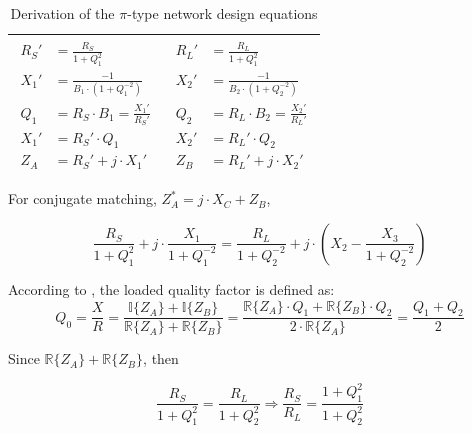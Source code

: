 \begin{table}[H]
\begin{tabular}{ | c | c | }
\begin{minipage}{.4\textwidth}
{\begin{align}
           R_S' &= \frac{R_S}{1 + Q_1^2}\\
           X_1' &= \frac{-1}{B_1 \cdot (1 + Q_1^{-2})} \\
           Q_1 &= R_S \cdot B_1 = \frac{X_1'}{R_S'}\\
           X_1' &= R_S' \cdot Q_1\\
           Z_A &= R_S' + j\cdot X_1'
         \end{align}}
    \end{minipage}
    &
        \begin{minipage}{.4\textwidth}
         {\begin{align}
           R_L' &= \frac{R_L}{1 + Q_1^2}\\
           X_2' &= \frac{-1}{B_2 \cdot (1 + Q_2  ^{-2})} \\
           Q_2 &= R_L \cdot B_2 = \frac{X_2'}{R_L'}\\
           X_2' &= R_L' \cdot Q_2\\
           Z_B &= R_L' + j\cdot X_2'
         \end{align}}
    \end{minipage}
    \\ \hline
  \end{tabular}
  \caption{Derivation of the $\pi$-type network design equations}
  \label{tbl:pi-eqs}
\end{table}

\noindent For conjugate matching, $Z_A^* = j·X_C + Z_B$,

\begin{equation}
\frac{R_S}{1 + Q_1^2} + j \cdot \frac{X_1}{1 + Q_1^{-2}} = \frac{R_L}{1 + Q_2^{-2}} + j \cdot \left( X_2 - \frac{X_3}{1 + Q_2^{-2}} \right)
\end{equation}

\noindent According to \cite{YSunMatching}, the loaded quality factor is defined as:
\begin{equation}
Q_0 = \frac{X}{R} = \frac{\mathbb{I} \lbrace Z_A \rbrace + \mathbb{I} \lbrace Z_B \rbrace}{\mathbb{R} \lbrace Z_A \rbrace + \mathbb{R} \lbrace Z_B \rbrace} = \frac{\mathbb{R} \lbrace Z_A\rbrace \cdot Q_1 + \mathbb{R} \lbrace Z_B\rbrace \cdot Q_2}{2 \cdot \mathbb{R} \lbrace Z_A\rbrace} = \frac{Q_1 + Q_2}{2}
\label{eq:PiMatchingQ}
\end{equation}

\noindent Since $\mathbb{R} \lbrace Z_A \rbrace + \mathbb{R} \lbrace Z_B \rbrace$, then

\begin{equation}
\frac{R_S}{1 + Q_1^2} = \frac{R_L}{1 + Q_2^2} \Longrightarrow \frac{R_S}{R_L} = \frac{1 + Q_1^2}{1 + Q_2^2}
\end{equation}


